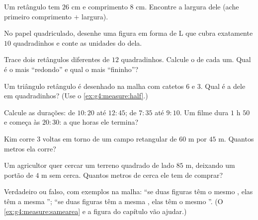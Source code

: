 \begin{exercise}[$\star$]\label{exo:g4:measure:4}
Um retângulo tem  $26$ cm e comprimento $8$ cm. Encontre a
largura dele (ache primeiro comprimento $+$ largura).
\end{exercise}

\begin{exercise}[$\star$]\label{exo:g4:measure:5}
No papel quadriculado, desenhe uma figura em forma de L que cubra
exatamente $10$ quadradinhos e conte as unidades do  dela.
\end{exercise}

\begin{exercise}[$\star$]\label{exo:g4:measure:6}
Trace dois retângulos diferentes de  $12$ quadradinhos. Calcule o
 de cada um. Qual é o mais ``redondo'' e qual o mais
``fininho''?
\end{exercise}

\begin{exercise}[$\star$]\label{exo:g4:measure:7}
Um triângulo retângulo é desenhado na malha com catetos $6$ e $3$.
Qual é a  dele em quadradinhos? (Use o
\cref{ex:g4:measure:half}.)
\end{exercise}

\begin{exercise}[$\star$]\label{exo:g4:measure:8}
Calcule as durações: de $10{:}20$ até $12{:}45$; de $7{:}35$ até
$9{:}10$. Um filme dura $1$ h $50$ e começa às $20{:}30$: a que
horas ele termina?
\end{exercise}

\begin{exercise}[$\star$]\label{exo:g4:measure:9}
Kim corre $3$ voltas em torno de um campo retangular de $60$ m por
$45$ m. Quantos metros ela corre?
\end{exercise}

\begin{exercise}[$\star\star$]\label{exo:g4:measure:10}
Um agricultor quer cercar um terreno quadrado de lado $85$ m,
deixando um portão de $4$ m sem cerca. Quantos metros de cerca ele
tem de comprar?
\end{exercise}

\begin{exercise}[$\star\star$]\label{exo:g4:measure:11}
Verdadeiro ou falso, com exemplos na malha: ``se duas figuras têm o
mesmo , elas têm a mesma ''; ``se duas figuras têm a
mesma , elas têm o mesmo ''.
(O \cref{ex:g4:measure:samearea} e a figura do capítulo vão
ajudar.)
\end{exercise}
